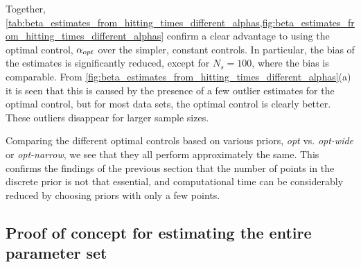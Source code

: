Together,
\cref{tab:beta_estimates_from_hitting_times_different_alphas,fig:beta_estimates_from_hitting_times_different_alphas}
confirm a clear advantage to using the optimal control, $\alpha_{opt}$ over the
simpler, constant controls. In particular, the bias of the estimates is
significantly reduced, except for $N_s=100$, where the bias is comparable. From
\cref{fig:beta_estimates_from_hitting_times_different_alphas}(a) it is
seen that this is caused by the presence of a few outlier estimates for
the optimal control, but for most data sets, the optimal control is
clearly better. These outliers disappear for larger sample sizes.

Comparing the different optimal
controls based on various priors, {\em opt} vs. {\em opt-wide} or {\em
  opt-narrow}, we see that they all perform approximately 
the same. This confirms the findings of the previous section that the
number of points in the discrete prior is not that essential, and
computational time can be considerably reduced by choosing priors with
only a few points.



\subsection{Proof of concept for estimating the entire parameter set}


